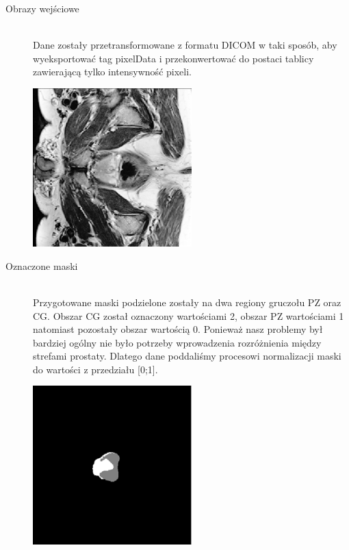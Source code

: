 \documentclass[a4paper,11pt,twoside]{report}
\theoremstyle{definition}
\begin{document}
\begin{description}
	\item [Obrazy wejściowe] \hfill \\
	Dane zostały przetransformowane z formatu DICOM w taki sposób, aby wyeksportować tag pixelData i przekonwertować do postaci tablicy zawierającą tylko intensywność pixeli.
	
	\begin{minipage}{\linewidth}
		\centering
		\includegraphics[width=0.5\textwidth]{segmentation/example_MRI_image.png}
	\end{minipage}


	\item [Oznaczone maski] \hfill \\
Przygotowane maski podzielone zostały na dwa regiony gruczołu PZ oraz CG. Obszar CG został oznaczony wartościami 2, obszar PZ wartościami 1 natomiast pozostały obszar wartością 0.  Ponieważ nasz problemy był bardziej ogólny nie było potrzeby wprowadzenia rozróżnienia między strefami prostaty. Dlatego dane poddaliśmy procesowi normalizacji maski do wartości z przedziału [0;1].

\begin{minipage}{\linewidth}
	\centering
	\includegraphics[width=0.5\textwidth]{segmentation/example_mask.png}
\end{minipage}


\end{description}
\end{document}
